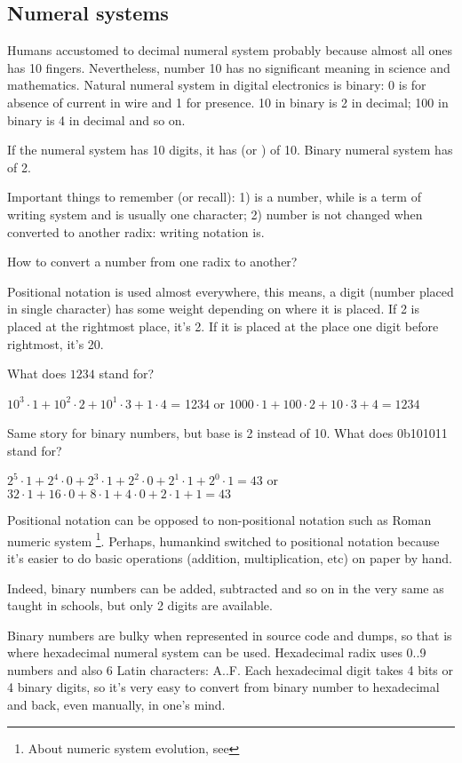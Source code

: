 \subsection{Numeral systems}

Humans accustomed to decimal numeral system probably because almost all ones has 10 fingers.
Nevertheless, number 10 has no significant meaning in science and mathematics.
Natural numeral system in digital electronics is binary: 0 is for absence of current in wire and 1 for presence.
10 in binary is 2 in decimal; 100 in binary is 4 in decimal and so on.

If the numeral system has 10 digits, it has  (or ) of 10.
Binary numeral system has  of 2.

Important things to remember (or recall):
1)  is a number, while  is a term of writing system and is usually one character;
2) number is not changed when converted to another radix: writing notation is.

How to convert a number from one radix to another?

Positional notation is used almost everywhere, this means, a digit (number placed in single character) has some weight depending on where it is placed.
If 2 is placed at the rightmost place, it's 2.
If it is placed at the place one digit before rightmost, it's 20.

What does $1234$ stand for?

$10^3 \cdot 1 + 10^2 \cdot 2 + 10^1 \cdot 3 + 1 \cdot 4$ = 1234 or 
$1000 \cdot 1 + 100 \cdot 2 + 10 \cdot 3 + 4 = 1234$

Same story for binary numbers, but base is 2 instead of 10.
What does 0b101011 stand for?

$2^5 \cdot 1 + 2^4 \cdot 0 + 2^3 \cdot 1 + 2^2 \cdot 0 + 2^1 \cdot 1 + 2^0 \cdot 1 = 43$ or
$32 \cdot 1 + 16 \cdot 0 + 8 \cdot 1 + 4 \cdot 0 + 2 \cdot 1 + 1 = 43$

Positional notation can be opposed to non-positional notation such as Roman numeric system
\footnote{About numeric system evolution, see }.
Perhaps, humankind switched to positional notation because it's easier to do basic operations (addition, multiplication, etc) on paper by hand.

Indeed, binary numbers can be added, subtracted and so on in the very same as taught in schools, but only 2 digits are available.

Binary numbers are bulky when represented in source code and dumps, so that is where hexadecimal numeral system can be used.
Hexadecimal radix uses 0..9 numbers and also 6 Latin characters: A..F.
Each hexadecimal digit takes 4 bits or 4 binary digits, so it's very easy to convert from binary number to hexadecimal and back, even manually, in one's mind.

